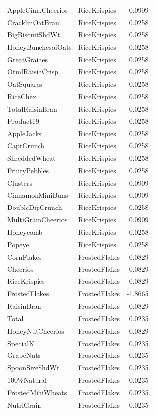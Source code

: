 \begin{longtable}{llr}
AppleCinn.Cheerios & RiceKrispies & 0.0909 \\
CracklinOatBran & RiceKrispies & 0.0258 \\
BigBiscuitShdWt & RiceKrispies & 0.0258 \\
HoneyBunchesofOats & RiceKrispies & 0.0258 \\
GreatGraines & RiceKrispies & 0.0258 \\
OtmlRaisinCrisp & RiceKrispies & 0.0258 \\
OatSquares & RiceKrispies & 0.0258 \\
RiceChex & RiceKrispies & 0.0258 \\
TotalRaisinBran & RiceKrispies & 0.0258 \\
Product19 & RiceKrispies & 0.0258 \\
AppleJacks & RiceKrispies & 0.0258 \\
CaptCrunch & RiceKrispies & 0.0258 \\
ShreddedWheat & RiceKrispies & 0.0258 \\
FruityPebbles & RiceKrispies & 0.0258 \\
Clusters & RiceKrispies & 0.0909 \\
CinnamonMiniBuns & RiceKrispies & 0.0909 \\
DoubleDipCrunch & RiceKrispies & 0.0258 \\
MultiGrainCheerios & RiceKrispies & 0.0909 \\
Honeycomb & RiceKrispies & 0.0258 \\
Popeye & RiceKrispies & 0.0258 \\
CornFlakes & FrostedFlakes & 0.0829 \\
Cheerios & FrostedFlakes & 0.0829 \\
RiceKrispies & FrostedFlakes & 0.0829 \\
FrostedFlakes & FrostedFlakes & -1.8665 \\
RaisinBran & FrostedFlakes & 0.0829 \\
Total & FrostedFlakes & 0.0235 \\
HoneyNutCheerios & FrostedFlakes & 0.0829 \\
SpecialK & FrostedFlakes & 0.0235 \\
GrapeNuts & FrostedFlakes & 0.0235 \\
SpoonSizeShdWt & FrostedFlakes & 0.0235 \\
100\%Natural & FrostedFlakes & 0.0235 \\
FrostedMiniWheats & FrostedFlakes & 0.0235 \\
NutriGrain & FrostedFlakes & 0.0235 \\

\end{longtable}
